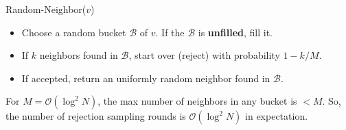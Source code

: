 \begin{alertblock}{Random-Neighbor($v$)}
\begin{itemize}
    \item Choose a random bucket $\mathcal B$ of $v$. If the $\mathcal B$ is \textbf{unfilled}, fill it.
    \item If $k$ neighbors found in $\mathcal B$, start over (reject) with probability $1-k/M$.
    \item If accepted, return an uniformly random neighbor found in $\mathcal B$.
\end{itemize}
For $M = \mathcal O(\log^2 N)$, the max number of neighbors in any bucket is $<M$.
So, the number of rejection sampling rounds is $\mathcal O(\log^2 N)$ in expectation.
\end{alertblock}









